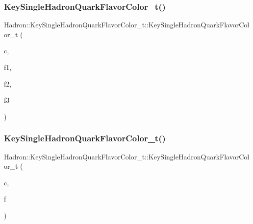 \subsubsection{\texorpdfstring{KeySingleHadronQuarkFlavorColor\_t()}{KeySingleHadronQuarkFlavorColor\_t()}\hspace{0.1cm}{\footnotesize\ttfamily [4/10]}}
{\footnotesize\ttfamily Hadron\+::\+Key\+Single\+Hadron\+Quark\+Flavor\+Color\+\_\+t\+::\+Key\+Single\+Hadron\+Quark\+Flavor\+Color\+\_\+t (\begin{DoxyParamCaption}\item[{const std\+::string \&}]{c,  }\item[{const \mbox{\hyperlink{structHadron_1_1SingleHadronQuarkFlavor__t}{Single\+Hadron\+Quark\+Flavor\+\_\+t}} \&}]{f1,  }\item[{const \mbox{\hyperlink{structHadron_1_1SingleHadronQuarkFlavor__t}{Single\+Hadron\+Quark\+Flavor\+\_\+t}} \&}]{f2,  }\item[{const \mbox{\hyperlink{structHadron_1_1SingleHadronQuarkFlavor__t}{Single\+Hadron\+Quark\+Flavor\+\_\+t}} \&}]{f3 }\end{DoxyParamCaption})\hspace{0.3cm}{\ttfamily [inline]}}

\mbox{\label{structHadron_1_1KeySingleHadronQuarkFlavorColor__t_aa894166327f6565a8ec49fd863dadf47}} 
\subsubsection{\texorpdfstring{KeySingleHadronQuarkFlavorColor\_t()}{KeySingleHadronQuarkFlavorColor\_t()}\hspace{0.1cm}{\footnotesize\ttfamily [5/10]}}
{\footnotesize\ttfamily Hadron\+::\+Key\+Single\+Hadron\+Quark\+Flavor\+Color\+\_\+t\+::\+Key\+Single\+Hadron\+Quark\+Flavor\+Color\+\_\+t (\begin{DoxyParamCaption}\item[{const std\+::string \&}]{c,  }\item[{const \mbox{\hyperlink{classADAT_1_1Array1dO}{Array1dO}}$<$ \mbox{\hyperlink{structHadron_1_1SingleHadronQuarkFlavor__t}{Single\+Hadron\+Quark\+Flavor\+\_\+t}} $>$ \&}]{f }\end{DoxyParamCaption})\hspace{0.3cm}{\ttfamily [inline]}}

